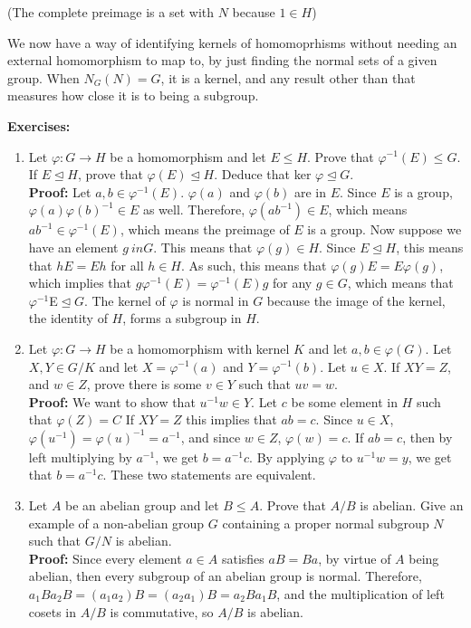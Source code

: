 \documentclass{article}
\begin{document}
(The complete preimage is a set with $N$ because $1 \in H$)

We now have a way of identifying kernels of homomoprhisms without needing an external homomorphism to map to, by just finding the normal sets of a given group. When $N_G(N) = G$, it is a kernel, and any result other than that measures how close it is to being a subgroup. 

\textbf{Exercises:} 

\begin{enumerate}
    \item Let $\varphi : G \rightarrow H$ be a homomorphism and let $E \leq H$. Prove that $\varphi ^{-1} (E) \leq G$. If $E \trianglelefteq H$, prove that $\varphi (E) \trianglelefteq H$. Deduce that ker $\varphi \trianglelefteq G$. \\ \textbf{Proof:} Let $a,b \in \varphi ^{-1} (E)$. $\varphi (a)$ and $\varphi (b)$ are in $E$. Since $E$ is a group, $\varphi(a) \varphi(b) ^{-1} \in E$ as well. Therefore, $\varphi(ab ^{-1} ) \in E$, which means $ab ^{-1} \in \varphi ^{-1} (E)$, which means the preimage of $E$ is a group. Now suppose we have an element $g \ in G$. This means that $\varphi (g) \in H$. Since $E \trianglelefteq H$, this means that $hE = Eh$ for all $h \in H$. As such, this means that $\varphi (g)E = E \varphi (g)$, which implies that $g \varphi ^{-1} (E) = \varphi ^{-1} (E) g$ for any $g \in G$, which means that $\varphi ^{-1} $E$ \trianglelefteq G$. The kernel of $\varphi $ is normal in $G$ because the image of the kernel, the identity of $H$, forms a subgroup in $H$. 
    \item Let $\varphi : G \rightarrow H$ be a homomorphism with kernel $K$ and let $a,b \in \varphi (G)$. Let $X,Y \in G/K$ and let $X = \varphi ^{-1} (a)$ and $Y = \varphi ^{-1} (b)$. Let $u \in X$. If $XY = Z$, and $w \in Z$, prove there is some $v \in Y$ such that $uv = w$. \\\textbf{Proof:} We want to show that $u ^{-1}  w\in Y$. Let $c$ be some element in $H$ such that $\varphi (Z) = C$ If $XY = Z$ this implies that $ab = c$. Since $u \in X$, $\varphi (u ^{-1}) = \varphi (u) ^{-1}  = a ^{-1} $, and since $w \in Z$, $\varphi (w) = c$. If $ab = c$, then by left multiplying by $a ^{-1}$, we get $b = a ^{-1} c$. By applying $\varphi$ to $u ^{-1} w = y$, we get that $b = a ^{-1} c$. These two statements are equivalent. 
    \item Let $A$ be an abelian group and let $B \leq A$. Prove that $A/B$ is abelian. Give an example of a non-abelian group $G$ containing a proper normal subgroup $N$ such that $G/N$ is abelian. \\ \textbf{Proof:} Since every element $a \in A$ satisfies $aB = Ba$, by virtue of $A$ being abelian, then every subgroup of an abelian group is normal. Therefore, $a_1B a_2B = (a_1a_2)B = (a_2a_1)B = a_2B a_1B$, and the multiplication of left cosets in $A/B$ is commutative, so $A/B$ is abelian.

\end{enumerate}
\end{document}
